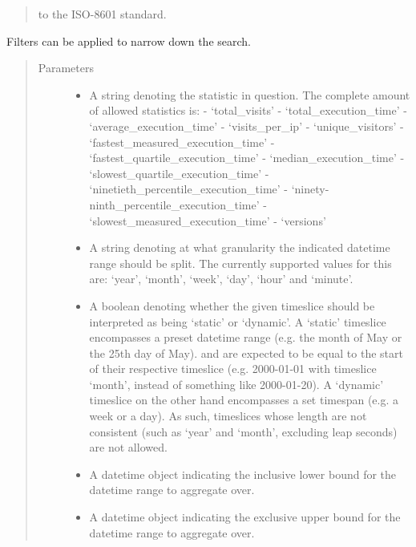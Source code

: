 \documentclass[letterpaper,10pt,english]{sphinxmanual}
\begin{document}
\begin{fulllineitems}
\begin{fulllineitems}
\begin{quote}
to the ISO-8601 standard.
\end{quote}

Filters can be applied to narrow down the search.
\begin{quote}\begin{description}
\item[{Parameters}] \leavevmode\begin{itemize}
\item {} 
 \textendash{} A string denoting the statistic in question. The complete amount of allowed statistics is:
- ‘total\_visits’
- ‘total\_execution\_time’
- ‘average\_execution\_time’
- ‘visits\_per\_ip’
- ‘unique\_visitors’
- ‘fastest\_measured\_execution\_time’
- ‘fastest\_quartile\_execution\_time’
- ‘median\_execution\_time’
- ‘slowest\_quartile\_execution\_time’
- ‘ninetieth\_percentile\_execution\_time’
- ‘ninety-ninth\_percentile\_execution\_time’
- ‘slowest\_measured\_execution\_time’
- ‘versions’

\item {} 
 \textendash{} A string denoting at what granularity the indicated datetime range should be split.
The currently supported values for this are: ‘year’, ‘month’, ‘week’, ‘day’, ‘hour’ and ‘minute’.

\item {} 
 \textendash{} A boolean denoting whether the given timeslice should be interpreted as being ‘static’ or ‘dynamic’.
A ‘static’ timeslice encompasses a preset datetime range (e.g. the month of May or the 25th day of May).
 and  are expected to be equal to the start of their respective timeslice
(e.g. 2000-01-01 with timeslice ‘month’, instead of something like 2000-01-20).
A ‘dynamic’ timeslice on the other hand encompasses a set timespan (e.g. a week or a day).
As such, timeslices whose length are not consistent (such as ‘year’ and ‘month’, excluding leap seconds) are not allowed.

\item {} 
 \textendash{} A datetime object indicating the inclusive lower bound for the datetime range to
aggregate over.

\item {} 
 \textendash{} A datetime object indicating the exclusive upper bound for the datetime range to
aggregate over.


\end{itemize}
\end{description}
\end{quote}
\end{fulllineitems}
\end{fulllineitems}
\end{document}
